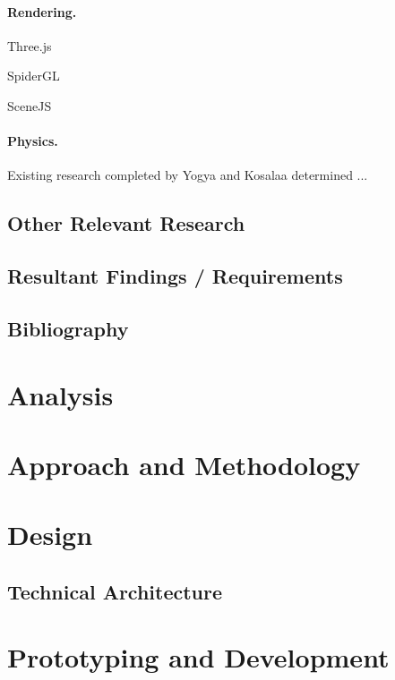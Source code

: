 \documentclass[a4paper, 12pt]{article}
\begin{document}
\paragraph{Rendering.}
Three.js

SpiderGL

SceneJS


\paragraph{Physics.}
Existing research completed by Yogya and Kosalaa determined ...



\subsection{Other Relevant Research}
\subsection{Resultant Findings / Requirements}
\subsection{Bibliography}

{}


\section{Analysis}
\section{Approach and Methodology}
\section{Design}
\subsection{Technical Architecture}
\section{Prototyping and Development}
\end{document}
